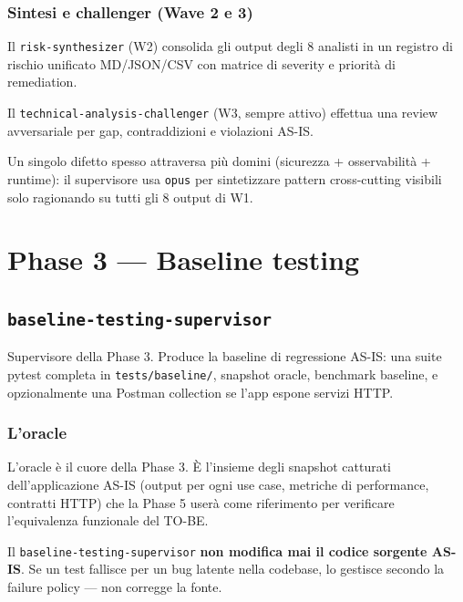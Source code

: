 \documentclass[12pt,a4paper,twoside]{book}
\begin{document}
\subsection{Sintesi e challenger (Wave 2 e 3)}

Il \texttt{risk-synthesizer} (W2) consolida gli output degli 8 analisti in un registro di rischio unificato MD/JSON/CSV con matrice di severity e priorità di remediation.

Il \texttt{technical-analysis-challenger} (W3, sempre attivo) effettua una review avversariale per gap, contraddizioni e violazioni AS-IS.

Un singolo difetto spesso attraversa più domini (sicurezza + osservabilità + runtime): il supervisore usa \texttt{opus} per sintetizzare pattern cross-cutting visibili solo ragionando su tutti gli 8 output di W1.

\chapter{Phase 3 — Baseline testing}

\section{\texttt{baseline-testing-supervisor}}

Supervisore della Phase 3. Produce la baseline di regressione AS-IS: una suite pytest completa in \texttt{tests/baseline/}, snapshot oracle, benchmark baseline, e opzionalmente una Postman collection se l'app espone servizi HTTP.

\subsection{L'oracle}

L'oracle è il cuore della Phase 3. È l'insieme degli snapshot catturati dell'applicazione AS-IS (output per ogni use case, metriche di performance, contratti HTTP) che la Phase 5 userà come riferimento per verificare l'equivalenza funzionale del TO-BE.

\begin{attenzione}
Il \texttt{baseline-testing-supervisor} \textbf{non modifica mai il codice sorgente AS-IS}. Se un test fallisce per un bug latente nella codebase, lo gestisce secondo la failure policy — non corregge la fonte.
\end{attenzione}
\end{document}
